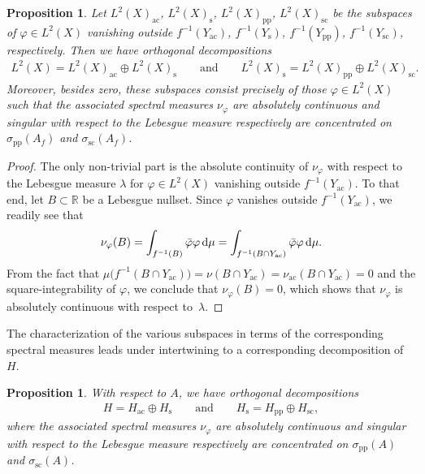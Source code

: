 \documentclass[10pt,a4paper]{amsart}
\numberwithin{equation}{section}
\newtheorem{Proposition}[Theorem]{Proposition}
\def\p{\mathrm{pp}}
\def\ac{\mathrm{ac}}
\def\sc{\mathrm{sc}}
\def\s{\mathrm s}
\def\R{\mathbb R}
\def\vf{\varphi}
\begin{document}
\begin{Proposition}%
Let $L^2(X)_{\ac}$, $L^2(X)_{\s}$, $L^2(X)_{\p}$, $L^2(X)_{\sc}$ be the subspaces of $\vf\in L^2(X)$
vanishing outside $f^{-1}(Y_{\ac})$, $f^{-1}(Y_{\s})$, $f^{-1}(Y_{\p})$, $f^{-1}(Y_{\sc})$, respectively.
Then we have orthogonal decompositions
\begin{align*}
	L^2(X) = L^2(X)_{\ac}\oplus L^2(X)_{\s}
	\qquad\text{and}\qquad
	L^2(X)_{\s} = L^2(X)_{\p}\oplus L^2(X)_{\sc}.
\end{align*}
Moreover, besides zero, these subspaces consist precisely of those $\vf\in L^2(X)$
such that the associated spectral measures $\nu_\vf$ are absolutely continuous and singular with respect to the Lebesgue measure
respectively are concentrated on $\sigma_{\p}(A_f)$ and $\sigma_{\sc}(A_f)$.
\end{Proposition}

\begin{proof}
The only non-trivial part is the absolute continuity of $\nu_\vf$ with respect to the Lebesgue measure $\lambda$
for $\vf\in L^2(X)$ vanishing outside $f^{-1}(Y_{\ac})$.
To that end, let $B \subset \R$ be a Lebesgue nullset.
Since $\vf$ vanishes outside $f^{-1}(Y_{\ac})$, we readily see that
\[
\nu_{\vf}(B) = \int_{f^{-1}(B)} \bar{\vf} \vf\, {\rm d} \mu = \int_{f^{-1}(B \cap Y_{\ac})} \bar{\vf} \vf \,{\rm d} \mu.
\]
From the fact that $\mu\bigl(f^{-1}(B \cap Y_{\ac})\bigr) = \nu(B \cap Y_{\ac}) = \nu_{\ac}(B \cap Y_{\ac}) = 0$
and the square-integrability of $\vf$, we conclude that $\nu_{\vf}(B) = 0$,
which shows that $\nu_{\vf}$ is absolutely continuous with respect to~$\lambda$.
\end{proof}

The characterization of the various subspaces in terms of the corresponding spectral measures
leads under intertwining to a corresponding decomposition of $H$.

\begin{Proposition}%
With respect to $A$, we have orthogonal decompositions
\begin{align*}
	H = H_{\ac} \oplus H_{\s} \qquad\text{and}\qquad H_{\s} = H_{\p} \oplus H_{\sc},
\end{align*}
where the associated spectral measures $\nu_\vf$ are absolutely continuous and singular with respect to the Lebesgue measure
respectively are concentrated on $\sigma_{\p}(A)$ and $\sigma_{\sc}(A)$.
\end{Proposition}
\end{document}
